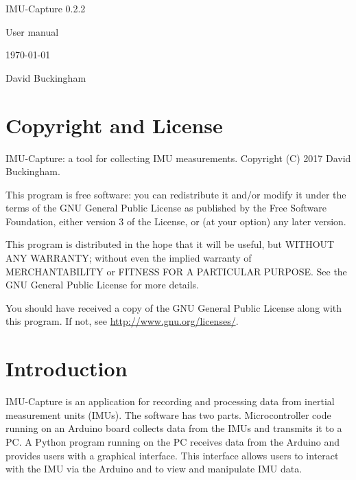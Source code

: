 \documentclass[11pt,letterpaper,article,oneside]{memoir}
\newcommand{\name}{IMU-Capture}
\newcommand{\programVersion}{0.2.2}
\begin{document}
\thispagestyle{empty}

{%
\centering
\Large

\vspace*{\fill}

{\huge
\name{} \programVersion{}
}

{\LARGE
User manual
}

\today

David Buckingham

\vspace*{\fill}

}

\cleardoublepage

\tableofcontents*

\clearpage




\chapter{Copyright and License}

\name{}: a tool for collecting IMU measurements.
Copyright (C) 2017 David Buckingham.

This program is free software: you can redistribute it and/or modify
it under the terms of the GNU General Public License as published by
the Free Software Foundation, either version 3 of the License, or
(at your option) any later version.

This program is distributed in the hope that it will be useful,
but WITHOUT ANY WARRANTY; without even the implied warranty of
MERCHANTABILITY or FITNESS FOR A PARTICULAR PURPOSE.  See the
GNU General Public License for more details.

You should have received a copy of the GNU General Public License
along with this program.  If not, see \url{http://www.gnu.org/licenses/}.




\chapter{Introduction}

\name{} is an application for recording and processing data from inertial
measurement units (IMUs). The software has two parts. Microcontroller code
running on an Arduino board collects data from the IMUs and transmits it to a
PC. A Python program running on the PC receives data from the Arduino and
provides users with a graphical interface. This interface allows users to
interact with the IMU via the Arduino and to view and manipulate IMU data.
\end{document}

